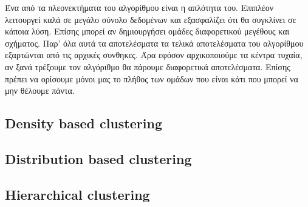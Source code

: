 Ένα από τα πλεονεκτήματα του αλγορίθμου είναι η απλότητα του. Επιπλέον λειτουργεί καλά σε μεγάλο σύνολο δεδομένων και εξασφαλίζει ότι θα συγκλίνει σε κάποια λύση. Επίσης μπορεί αν δημιουργήσει
ομάδες διαφορετικού μεγέθους και σχήματος. Παρ' όλα αυτά τα αποτελέσματα τα τελικά αποτελέσματα του αλγορίθμου εξαρτώνται από τις αρχικές συνθηκες. Άρα εφόσον αρχικοποιούμε τα κέντρα τυχαία, αν
ξανά τρέξουμε τον αλγόριθμο θα πάρουμε διαφορετικά αποτελέσματα. Επίσης πρέπει να ορίσουμε μόνοι μας το πλήθος των ομάδων που είναι κάτι που μπορεί να μην θέλουμε πάντα\cite{kmeans1}.
\subsection{\textlatin{Density based clustering}}
\subsection{\textlatin{Distribution based clustering}}
\subsection{\textlatin{Hierarchical clustering}}